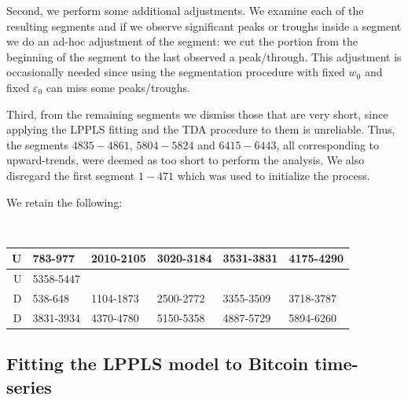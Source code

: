 \documentclass[11pt]{amsart}
\theoremstyle{definition}
\theoremstyle{remark}
\numberwithin{equation}{section}
\newcommand{\eps}{\varepsilon}
\begin{document}
Second, we perform some additional adjustments.
We examine each of the resulting segments and if we observe  significant peaks or troughs inside  a segment  we do an ad-hoc adjustment of the segment: we cut the portion from the beginning of the segment to the last observed a peak/through.
This adjustment is occasionally needed since  using the segmentation procedure with fixed $w_0$ and fixed $\eps_0$
can miss some peaks/troughs. %



Third, from the remaining segments we  dismiss those that are very short, since  applying the LPPLS fitting and the TDA procedure to them is unreliable.
Thus, the segments $4835-4861$,  $5804-5824$ and $6415-6443$,  all corresponding  to upward-trends, were deemed as too short to perform the analysis.
We also disregard the first segment $1-471$ which was used to initialize  the process.

We retain the following:


\smallskip


\\
\begin{tabular}{|r|l|l|l|l|l|}
  \hline
U     & 783-977 &2010-2105&3020-3184& 3531-3831& 4175-4290\\
\hline
U  & 5358-5447& & & & \\
\hline
D & 538-648& 1104-1873& 2500-2772&3355-3509&3718-3787\\
\hline
D &3831-3934 & 4370-4780& 5150-5358&4887-5729& 5894-6260  \\
  \hline
\end{tabular}





\subsection{Fitting the LPPLS model to Bitcoin time-series}
\label{sec:LPPLS_fit}


\end{document}
